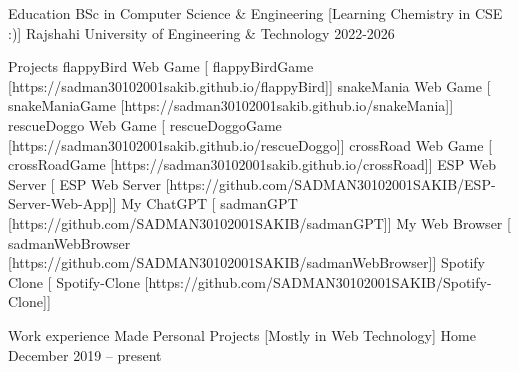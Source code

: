 \documentclass[
]{llresume}
\begin{document}
\makeheader

\begin{mainpane}
    \begin{mainsection}{Education}
        \entryJob
            {BSc in Computer Science \& Engineering}
            [Learning Chemistry in CSE :)]
            {Rajshahi University of Engineering \& Technology}
            {2022-2026}
    \end{mainsection}

    \begin{mainsection}{Projects}
        \entryGeneric
            {flappyBird Web Game}
            [\infoFlickr
                {flappyBirdGame}
                [https://sadman30102001sakib.github.io/flappyBird]]
        \entryGeneric
            {snakeMania Web Game}
            [\infoFlickr
                {snakeManiaGame}
                [https://sadman30102001sakib.github.io/snakeMania]]
        \entryGeneric
            {rescueDoggo Web Game}
            [\infoFlickr
                {rescueDoggoGame}
                [https://sadman30102001sakib.github.io/rescueDoggo]]
        \entryGeneric
            {crossRoad Web Game}
            [\infoFlickr
                {crossRoadGame}
                [https://sadman30102001sakib.github.io/crossRoad]]
        \entryGeneric
            {ESP Web Server}
            [\infoFlickr
                {ESP Web Server}
                [https://github.com/SADMAN30102001SAKIB/ESP-Server-Web-App]]
        \entryGeneric
            {My ChatGPT}
            [\infoFlickr
                {sadmanGPT}
                [https://github.com/SADMAN30102001SAKIB/sadmanGPT]]
        \entryGeneric
            {My Web Browser}
            [\infoFlickr
                {sadmanWebBrowser}
                [https://github.com/SADMAN30102001SAKIB/sadmanWebBrowser]]
        \entryGeneric
            {Spotify Clone}
            [\infoFlickr
                {Spotify-Clone}
                [https://github.com/SADMAN30102001SAKIB/Spotify-Clone]]
    \end{mainsection}

    \begin{mainsection}{Work experience}
        \entryJob
            {Made Personal Projects}
            [Mostly in Web Technology]
            {Home}
            {December 2019 -- present}
    \end{mainsection}


\end{mainpane}
\end{document}
